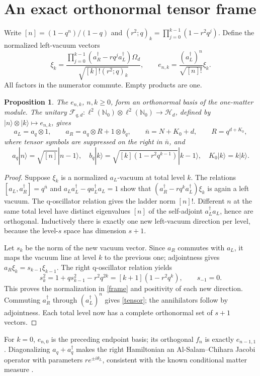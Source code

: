 \documentclass[11pt]{article}
\newtheorem{proposition}{Proposition}
\newcommand{\ket}[1]{|#1\rangle}
\newcommand{\F}{\mathcal F}
\begin{document}
\newpage
\section{An exact orthonormal tensor frame}
Write $[n]=(1-q^n)/(1-q)$ and
$(r^2;q)_k=\prod_{j=0}^{k-1}(1-r^2q^j)$.
Define the normalized left-vacuum vectors
\begin{equation}
 \xi_k=\frac{\prod_{j=0}^{k-1}
       (a_R^\dagger-rq^j a_L^\dagger)\Omega_d}
                {\sqrt{[k]!(r^2;q)_k}},\qquad
 e_{n,k}=\frac{(a_L^\dagger)^n}{\sqrt{[n]!}}\xi_k.
 \label{frame}
\end{equation}
All factors in the numerator commute. Empty products are one.

\begin{proposition}\label{orthogonal}
The $e_{n,k}$, $n,k\ge0$, form an orthonormal basis of the
one-matter module. The unitary
$\F_{q,d}:\ell^2(\mathbb N_0)\otimes\ell^2(\mathbb N_0)
\to\mathcal H_d$, defined by $\ket{n}\otimes\ket{k}\mapsto e_{n,k}$,
gives
\begin{equation}
 a_L=a_q\otimes1,\qquad
 a_R=a_q\otimes R+1\otimes b_q,\qquad
 \bar n=N+K_0+d,\qquad R=q^{d+K_0},\label{tensor}
\end{equation}
where tensor symbols are suppressed on the right in $\bar n$,
and
\[
 a_q\ket n=\sqrt{[n]}\ket{n-1},\quad
 b_q\ket k=\sqrt{[k](1-r^2q^{k-1})}\ket{k-1},\quad K_0\ket k=k\ket k.
\]
\end{proposition}
\begin{proof}
Suppose $\xi_k$ is a normalized $a_L$-vacuum at total level $k$.
The relations $[a_L,a_R^\dagger]=q^{\bar n}$ and
$a_La_L^\dagger-qa_L^\dagger a_L=1$ show that
$(a_R^\dagger-rq^ka_L^\dagger)\xi_k$ is again a left vacuum.
The q-oscillator relation gives the ladder norm $[n]!$.
Different $n$ at the same total level have distinct eigenvalues
$[n]$ of the self-adjoint $a_L^\dagger a_L$, hence are orthogonal.
Inductively there is exactly one new left-vacuum direction per
level, because the level-$s$ space has dimension $s+1$.

Let $s_k$ be the norm of the new vacuum vector. Since $a_R$
commutes with $a_L$, it maps the vacuum line at level $k$ to
the previous one; adjointness gives $a_R\xi_k=s_{k-1}\xi_{k-1}$.
The right q-oscillator relation yields
\[
 s_k^2=1+q s_{k-1}^2-r^2q^{2k}
      =[k+1](1-r^2q^k),\qquad s_{-1}=0.
\]
This proves the normalization in \eqref{frame} and positivity
of each new direction. Commuting $a_R^\dagger$ through
$(a_L^\dagger)^n$ gives \eqref{tensor}; the annihilators follow
by adjointness. Each total level now has a complete orthonormal
set of $s+1$ vectors.
\end{proof}
For $k=0$, $e_{n,0}$ is the preceding endpoint basis; its
orthogonal $f_n$ is exactly $e_{n-1,1}$.
Diagonalizing $a_q+a_q^\dagger$ makes the right Hamiltonian
an Al-Salam--Chihara Jacobi operator with parameters
$re^{\pm i\theta_L}$, consistent with the known conditional
matter measure \cite{Xu,DLMFq}.
\end{document}
